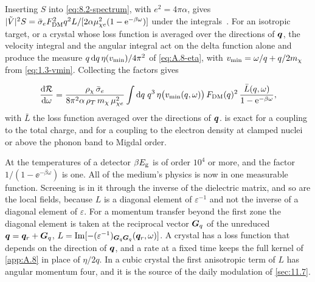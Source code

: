 Inserting $S$ into \cref{eq:8.2-spectrum}, with $e^2 = 4\pi\alpha$, gives $|\tilde V|^2 S = \bar{\sigma}_{e}F_{\mathrm{DM}}^2q^2L/[2\alpha\mu_{\chi e}^2(1 - \mathrm{e}^{-\beta\omega})]$ under the integrals~\cites[Eq.~(13)]{knapen2021dark}[Eq.~(1)]{hochberg2021determining}. For an isotropic target, or a crystal whose loss function is averaged over the directions of $\bm{q}$, the velocity integral and the angular integral act on the delta function alone and produce the measure $q\,\mathrm{d} q\,\eta(v_{\mathrm{min}})/4\pi^2$ of \cref{eq:A.8-eta}, with $v_{\mathrm{min}} = \omega/q + q/2m_{\chi}$ from \cref{eq:1.3-vmin}. Collecting the factors gives
\begin{keyresult}
\begin{equation}
  \frac{\mathrm{d}\mathcal{R}}{\mathrm{d}\omega} = \frac{\rho_\chi\,\bar{\sigma}_{e}}{8\pi^2\alpha\,\rho_T\,m_{\chi}\,\mu_{\chi e}^2}\int\mathrm{d} q\;q^3\,\eta\bigl(v_{\mathrm{min}}(q,\omega)\bigr)\,F_{\mathrm{DM}}(q)^2\,\frac{\bar L(q,\omega)}{1 - \mathrm{e}^{-\beta\omega}} ,
  \label{eq:10.2-rate}
\end{equation}
with $\bar L$ the loss function averaged over the directions of $\bm{q}$.  is exact for a coupling to the total charge, and for a coupling to the electron density at clamped nuclei or above the phonon band to Migdal order.
\end{keyresult}
\noindent At the temperatures of a detector $\beta E_{\mathrm{g}}$ is of order $10^4$ or more, and the factor $1/(1 - \ee^{-\beta\omega})$ is one. All of the medium's physics is now in one measurable function. Screening is in it through the inverse of the dielectric matrix, and so are the local fields, because $L$ is a diagonal element of $\varepsilon^{-1}$ and not the inverse of a diagonal element of $\varepsilon$. For a momentum transfer beyond the first zone the diagonal element is taken at the reciprocal vector $\bm{G}_q$ of the unreduced $\bm{q} = \bm{q}_r + \bm{G}_q$, $L = \operatorname{Im}[-(\varepsilon^{-1})_{\bm{G}_q\bm{G}_q}(\bm{q}_r,\omega)]$. A crystal has a loss function that depends on the direction of $\bm{q}$, and a rate at a fixed time keeps the full kernel of \cref{app:A.8} in place of $\eta/2q$. In a cubic crystal the first anisotropic term of $L$ has angular momentum four, and it is the source of the daily modulation of \cref{sec:11.7}.

